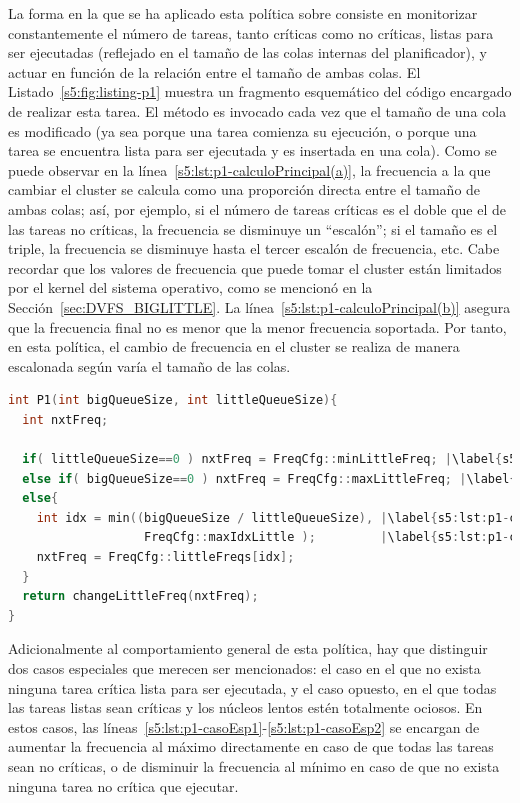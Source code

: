 La forma en la que se ha aplicado esta política sobre \botlev consiste en
monitorizar constantemente el número de tareas, tanto críticas como no
críticas, listas para ser ejecutadas (reflejado en el tamaño de las colas
internas del planificador), y actuar en función de la relación entre el
tamaño de ambas colas. El Listado~\ref{s5:fig:listing-p1} muestra un
fragmento esquemático del código encargado de realizar esta tarea. El
método es invocado cada vez que el tamaño de una cola es modificado (ya sea
porque una tarea comienza su ejecución, o porque una tarea se encuentra
lista para ser ejecutada y es insertada en una cola). Como se puede
observar en la línea~\ref{s5:lst:p1-calculoPrincipal(a)}, la frecuencia a
la que cambiar el cluster se calcula como una proporción directa entre el
tamaño de ambas colas; así, por ejemplo, si el número de tareas críticas es
el doble que el de las tareas no críticas, la frecuencia se disminuye un
``escalón''; si el tamaño es el triple, la frecuencia se disminuye hasta el
tercer escalón de frecuencia, etc. Cabe recordar que los valores de
frecuencia que puede tomar el cluster están limitados por el kernel del
sistema operativo, como se mencionó en la
Sección~\ref{sec:DVFS_BIGLITTLE}. La
línea~\ref{s5:lst:p1-calculoPrincipal(b)} asegura que la frecuencia final
no es menor que la menor frecuencia soportada. Por tanto, en esta política,
el cambio de frecuencia en el cluster se realiza de manera escalonada según
varía el tamaño de las colas.

\begin{lstlisting}[float,language=C++,caption={Fragmento de código esquemático para la política P1.}, label={s5:fig:listing-p1}]
int P1(int bigQueueSize, int littleQueueSize){
  int nxtFreq;
      
  if( littleQueueSize==0 ) nxtFreq = FreqCfg::minLittleFreq; |\label{s5:lst:p1-casoEsp1}|
  else if( bigQueueSize==0 ) nxtFreq = FreqCfg::maxLittleFreq; |\label{s5:lst:p1-casoEsp2}|
  else{
    int idx = min((bigQueueSize / littleQueueSize), |\label{s5:lst:p1-calculoPrincipal(a)}|
                   FreqCfg::maxIdxLittle );         |\label{s5:lst:p1-calculoPrincipal(b)}|
    nxtFreq = FreqCfg::littleFreqs[idx];
  }
  return changeLittleFreq(nxtFreq);
}
\end{lstlisting}

Adicionalmente al comportamiento general de esta política, hay que
distinguir dos casos especiales que merecen ser mencionados: el caso en el
que no exista ninguna tarea crítica lista para ser ejecutada, y el caso
opuesto, en el que todas las tareas listas sean críticas y los núcleos lentos
estén totalmente ociosos. En estos casos, las
líneas~\ref{s5:lst:p1-casoEsp1}-\ref{s5:lst:p1-casoEsp2} se encargan de
aumentar la frecuencia al máximo directamente en caso de que todas las
tareas sean no críticas, o de disminuir la frecuencia al mínimo en caso de
que no exista ninguna tarea no crítica que ejecutar.

